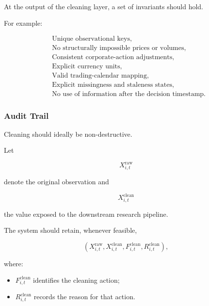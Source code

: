 \documentclass[11pt,a4paper]{article}
\begin{document}
At the output of the cleaning layer, a set of invariants should hold.

For example:

\begin{equation}
\boxed{
\begin{aligned}
&\text{Unique observational keys},\\
&\text{No structurally impossible prices or volumes},\\
&\text{Consistent corporate-action adjustments},\\
&\text{Explicit currency units},\\
&\text{Valid trading-calendar mapping},\\
&\text{Explicit missingness and staleness states},\\
&\text{No use of information after the decision timestamp}.
\end{aligned}
}
\end{equation}


\subsubsection{Audit Trail}

Cleaning should ideally be non-destructive.

Let

\begin{equation}
X_{i,t}^{\mathrm{raw}}
\end{equation}

denote the original observation and

\begin{equation}
X_{i,t}^{\mathrm{clean}}
\end{equation}

the value exposed to the downstream research pipeline.

The system should retain, whenever feasible,

\begin{equation}
\boxed{
\left(
X_{i,t}^{\mathrm{raw}},
X_{i,t}^{\mathrm{clean}},
F_{i,t}^{\mathrm{clean}},
R_{i,t}^{\mathrm{clean}}
\right),
}
\end{equation}

where:

\begin{itemize}
    \item $F_{i,t}^{\mathrm{clean}}$ identifies the cleaning action;
    \item $R_{i,t}^{\mathrm{clean}}$ records the reason for that action.
\end{itemize}
\end{document}
